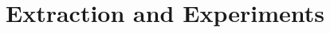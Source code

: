 \documentclass{llncs}
\begin{document}
%
%
%      



\section{Extraction and Experiments}
\end{document}
